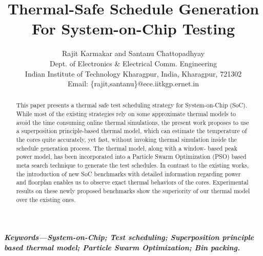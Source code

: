 \documentclass[conference]{IEEEtran}
\title{Thermal-Safe Schedule Generation For
System-on-Chip Testing}
\begin{document}
\author{Rajit Karmakar and Santanu Chattopadhyay\\
	Dept. of Electronics \& Electrical Comm. Engineering\\
		Indian Institute of Technology Kharagpur, India, Kharagpur, 721302\\
	Email: \{rajit,santanu\}@ece.iitkgp.ernet.in 
}

	\maketitle
	\begin{abstract}
		This paper presents a thermal safe test scheduling
strategy for System-on-Chip (SoC). While most of the existing
strategies rely on some approximate thermal models to avoid
the time consuming online thermal simulations, the present work
proposes to use a superposition principle-based thermal model,
which can estimate the temperature of the cores quite accurately,
yet fast, without invoking thermal simulation inside the schedule
generation process. The thermal model, along with a window-
based peak power model, has been incorporated into a Particle
Swarm Optimization (PSO) based meta search technique to
generate the test schedules. In contrast to the existing works, the
introduction of new SoC benchmarks with detailed information
regarding power and floorplan enables us to observe exact
thermal behaviors of the cores. Experimental results on these
newly proposed benchmarks show the superiority of our thermal
model over the existing ones.
	\end{abstract}
	
\textbf{\textit{Keywords---System-on-Chip; Test scheduling; Superposition
principle based thermal model; Particle Swarm Optimization; Bin
packing.}}
\end{document}
